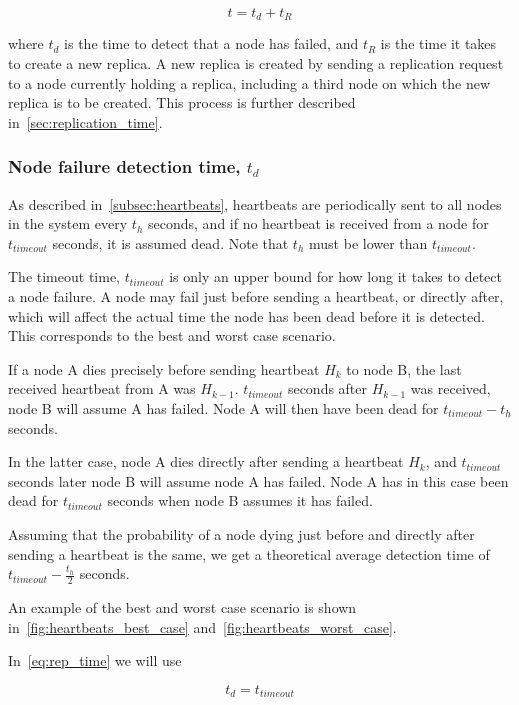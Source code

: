 \documentclass{cslthse-msc}
\begin{document}
\begin{equation} \label{eq:rep_time}
	t = t_d + t_R
\end{equation}

where $t_d$ is the time to detect that a node has failed, and $t_R$ is the time it takes to create a new replica. A new replica is created by sending a replication request to a node currently holding a replica, including a third node on which the new replica is to be created. This process is further described in~\cref{sec:replication_time}.

\subsubsection{Node failure detection time, $t_d$} \label{sec:node_failure_detection_time}
As described in~\cref{subsec:heartbeats}, heartbeats are periodically sent to all nodes in the system every $t_h$ seconds, and if no heartbeat is received from a node for $t_{timeout}$ seconds, it is assumed dead. Note that $t_h$ must be lower than $t_{timeout}$.

The timeout time, $t_{timeout}$ is only an upper bound for how long it takes to detect a node failure. A node may fail just before sending a heartbeat, or directly after, which will affect the actual time the node has been dead before it is detected. This corresponds to the best and worst case scenario. 

If a node A dies precisely before sending heartbeat $H_k$ to node B, the last received heartbeat from A was $H_{k - 1}$. $t_{timeout}$ seconds after $H_{k - 1}$ was received, node B will assume A has failed. Node A will then have been dead for $t_{timeout} - t_h$ seconds.

In the latter case, node A dies directly after sending a heartbeat $H_k$, and $t_{timeout}$ seconds later node B will assume node A has failed. Node A has in this case been dead for $t_{timeout}$ seconds when node B assumes it has failed.

Assuming that the probability of a node dying just before and directly after sending a heartbeat is the same, we get a theoretical average detection time of $t_{timeout} - \frac{t_h}{2}$ seconds. 

An example of the best and worst case scenario is shown in~\cref{fig:heartbeats_best_case} and~\cref{fig:heartbeats_worst_case}.

In~\cref{eq:rep_time} we will use

\begin{equation} \label{eq:node_failure_detection_time}
t_d = t_{timeout}
\end{equation}
\end{document}
